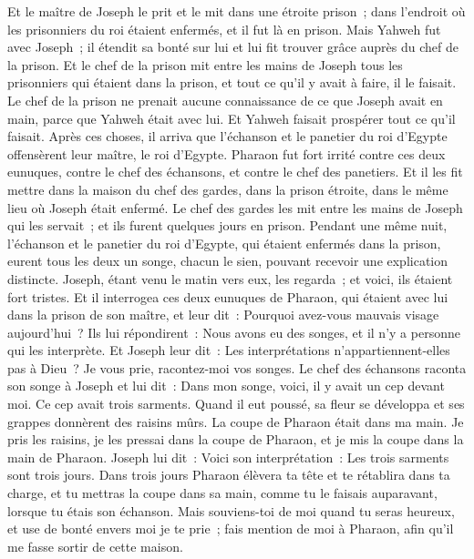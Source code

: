 \begin{multicols}{2}
Et le maître de Joseph le prit et le mit dans une étroite prison~; dans l'endroit où les prisonniers du roi étaient enfermés, et il fut là en prison.
Mais Yahweh fut avec Joseph~; il étendit sa bonté sur lui et lui fit trouver grâce auprès du chef de la prison.
Et le chef de la prison mit entre les mains de Joseph tous les prisonniers qui étaient dans la prison, et tout ce qu'il y avait à faire, il le faisait.
Le chef de la prison ne prenait aucune connaissance de ce que Joseph avait en main, parce que Yahweh était avec lui. Et Yahweh faisait prospérer tout ce qu'il faisait.
\VerseOne{}Après ces choses, il arriva que l'échanson et le panetier du roi d'Egypte offensèrent leur maître, le roi d'Egypte.
Pharaon fut fort irrité contre ces deux eunuques, contre le chef des échansons, et contre le chef des panetiers.
Et il les fit mettre dans la maison du chef des gardes, dans la prison étroite, dans le même lieu où Joseph était enfermé.
Le chef des gardes les mit entre les mains de Joseph qui les servait~; et ils furent quelques jours en prison.
Pendant une même nuit, l'échanson et le panetier du roi d'Egypte, qui étaient enfermés dans la prison, eurent tous les deux un songe, chacun le sien, pouvant recevoir une explication distincte.
Joseph, étant venu le matin vers eux, les regarda~; et voici, ils étaient fort tristes.
Et il interrogea ces deux eunuques de Pharaon, qui étaient avec lui dans la prison de son maître, et leur dit~: Pourquoi avez-vous mauvais visage aujourd'hui~?
Ils lui répondirent~: Nous avons eu des songes, et il n'y a personne qui les interprète. Et Joseph leur dit~: Les interprétations n'appartiennent-elles pas à Dieu~? Je vous prie, racontez-moi vos songes.
Le chef des échansons raconta son songe à Joseph et lui dit~: Dans mon songe, voici, il y avait un cep devant moi.
Ce cep avait trois sarments. Quand il eut poussé, sa fleur se développa et ses grappes donnèrent des raisins mûrs.
La coupe de Pharaon était dans ma main. Je pris les raisins, je les pressai dans la coupe de Pharaon, et je mis la coupe dans la main de Pharaon.
Joseph lui dit~: Voici son interprétation~: Les trois sarments sont trois jours.
Dans trois jours Pharaon élèvera ta tête et te rétablira dans ta charge, et tu mettras la coupe dans sa main, comme tu le faisais auparavant, lorsque tu étais son échanson.
Mais souviens-toi de moi quand tu seras heureux, et use de bonté envers moi je te prie~; fais mention de moi à Pharaon, afin qu'il me fasse sortir de cette maison.

\end{multicols}
